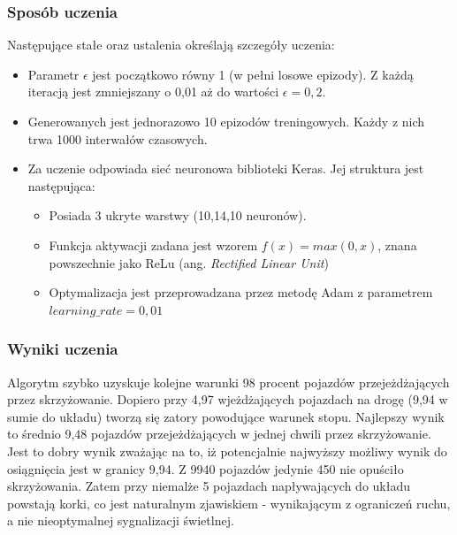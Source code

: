 \documentclass[12pt]{book}
\theoremstyle{plain}
\begin{document}
\subsubsection{Sposób uczenia}
Następujące stałe oraz ustalenia określają szczegóły uczenia:
\begin{itemize}
	\item Parametr $\epsilon$ jest początkowo równy 1 (w pełni losowe epizody). Z każdą iteracją jest zmniejszany o 0,01 aż do wartości $\epsilon=0,2$.
	\item Generowanych jest jednorazowo 10 epizodów treningowych. Każdy z nich trwa 1000 interwałów czasowych.
	\item Za uczenie odpowiada sieć neuronowa biblioteki Keras. Jej struktura jest następująca:  
	\begin{itemize}
		\item Posiada 3 ukryte warstwy (10,14,10 neuronów).
		\item Funkcja aktywacji zadana jest wzorem $f(x)=max({0,x})$, znana powszechnie jako ReLu (ang. \emph{Rectified Linear Unit})
		\item Optymalizacja jest przeprowadzana przez metodę Adam \cite{adam} z parametrem $learning\_rate = 0,01$
	\end{itemize}
\end{itemize}

\subsubsection*{Wyniki uczenia}
Algorytm szybko uzyskuje kolejne warunki 98 procent pojazdów przejeżdżających przez skrzyżowanie. Dopiero przy 4,97 wjeżdżających pojazdach na drogę (9,94 w sumie do układu) tworzą się zatory powodujące warunek stopu.
Najlepszy wynik to średnio 9,48 pojazdów przejeżdżających w jednej chwili przez skrzyżowanie. Jest to dobry wynik zważając na to, iż potencjalnie najwyższy możliwy wynik do osiągnięcia jest w granicy 9,94. Z 9940 pojazdów jedynie 450 nie opuściło skrzyżowania. Zatem przy niemalże 5 pojazdach napływających do układu powstają korki, co jest naturalnym zjawiskiem - wynikającym z ograniczeń ruchu, a nie nieoptymalnej sygnalizacji świetlnej.
\end{document}
